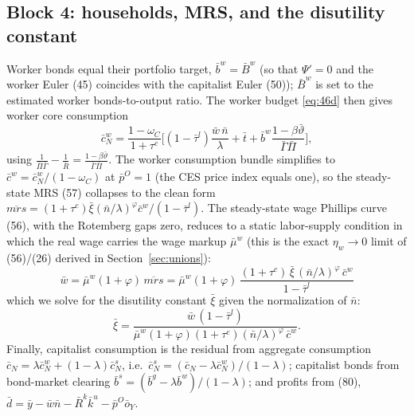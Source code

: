 \subsection{Block 4: households, MRS, and the disutility constant}
Worker bonds equal their portfolio target, $\bar b^w=\bar B^w$ (so that $\Psi'=0$ and the worker Euler
(45) coincides with the capitalist Euler (50)); $\bar B^w$ is set to the estimated worker
bonds-to-output ratio. The worker budget \eqref{eq:46d} then gives worker core consumption
\begin{equation}\label{eq:ss-cwn}
\bar c^w_N=\frac{1-\omega_C}{1+\tau^c}\Big[(1-\bar\tau^l)\frac{\bar w\,\bar n}{\lambda}+\bar t
+\bar b^w\frac{1-\beta\bar\vartheta}{\bar\Gamma\bar\Pi}\Big],
\end{equation}
using $\tfrac{1}{\bar\Pi\bar\Gamma}-\tfrac{1}{\bar R}=\tfrac{1-\beta\bar\vartheta}{\bar\Gamma\bar\Pi}$.
The worker consumption bundle simplifies to $\bar c^w=\bar c^w_N/(1-\omega_C)$ at $\bar p^O=1$ (the CES
price index equals one), so the steady-state MRS (57) collapses to the clean form
$\overline{mrs}=(1+\tau^c)\bar\xi(\bar n/\lambda)^\varphi\bar c^w/(1-\bar\tau^l)$. The steady-state wage
Phillips curve (56), with the Rotemberg gaps zero, reduces to a static labor-supply condition in
which the real wage carries the wage markup $\bar\mu^w$ (this is the exact $\eta_w\!\to\!0$ limit of
(56)/(26) derived in Section~\ref{sec:unions}):
\begin{equation}\label{eq:ss-wage}
\boxed{\,\bar w=\bar\mu^w(1+\varphi)\,\overline{mrs}
=\bar\mu^w(1+\varphi)\,\frac{(1+\tau^c)\,\bar\xi\,(\bar n/\lambda)^\varphi\,\bar c^w}{1-\bar\tau^l}\,}
\end{equation}
which we solve for the disutility constant $\bar\xi$ given the normalization of $\bar n$:
\begin{equation}\label{eq:ss-xi}
\bar\xi=\frac{\bar w\,(1-\bar\tau^l)}{\bar\mu^w(1+\varphi)(1+\tau^c)(\bar n/\lambda)^\varphi\,\bar c^w} .
\end{equation}
Finally, capitalist consumption is the residual from aggregate consumption
$\bar c_N=\lambda\bar c^w_N+(1-\lambda)\bar c^s_N$, i.e.\ $\bar c^s_N=(\bar c_N-\lambda\bar c^w_N)/(1-\lambda)$;
capitalist bonds from bond-market clearing $\bar b^s=(\bar b^g-\lambda\bar b^w)/(1-\lambda)$; and profits
from (80), $\bar d=\bar y-\bar w\bar n-\bar R^k\bar k^u-\bar p^O\bar o_Y$.


